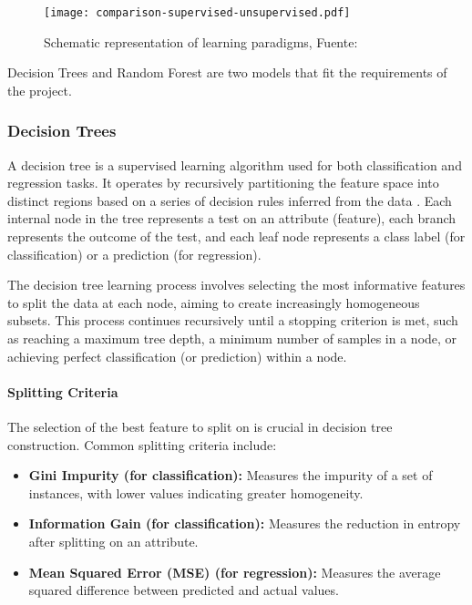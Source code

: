 \begin{figure}
	\caption{Schematic representation of learning paradigms, Fuente: \parencite{morimoto2021}} \label{fig:mlComparison}
	\begin{center}
		\texttt{[image: comparison-supervised-unsupervised.pdf]}
	\end{center}
\end{figure}


Decision Trees and Random Forest are two models that fit the requirements of the project.

\subsubsection{Decision Trees}
A decision tree is a supervised learning algorithm used for both classification and regression tasks.
It operates by recursively partitioning the feature space into distinct regions based on a series of decision rules inferred from the data \parencite{quinlan1986induction}.
Each internal node in the tree represents a test on an attribute (feature), each branch represents the outcome of the test, and each leaf node represents a class label (for classification) or a prediction (for regression).

The decision tree learning process involves selecting the most informative features to split the data at each node, aiming to create increasingly homogeneous subsets.
This process continues recursively until a stopping criterion is met, such as reaching a maximum tree depth, a minimum number of samples in a node, or achieving perfect classification (or prediction) within a node.

\paragraph{Splitting Criteria}
The selection of the best feature to split on is crucial in decision tree construction.
Common splitting criteria include:

\begin{itemize}
    \item \textbf{Gini Impurity (for classification):} Measures the impurity of a set of instances, with lower values indicating greater homogeneity.
    \item \textbf{Information Gain (for classification):} Measures the reduction in entropy after splitting on an attribute.
    \item \textbf{Mean Squared Error (MSE) (for regression):} Measures the average squared difference between predicted and actual values.
\end{itemize}


